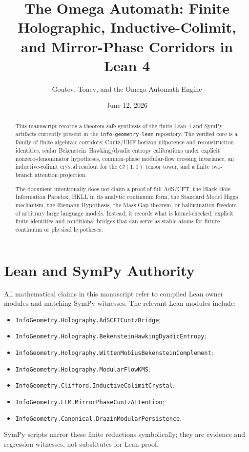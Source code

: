\documentclass[11pt,a4paper]{article}
\title{\textbf{The Omega Automath: Finite Holographic, Inductive-Colimit, and Mirror-Phase Corridors in Lean 4}}
\author{Goutev, Tonev, and the Omega Automath Engine}
\date{June 12, 2026}
\begin{document}
\maketitle

\begin{abstract}
This manuscript records a theorem-safe synthesis of the finite Lean 4 and SymPy
artifacts currently present in the \texttt{info-geometry-lean} repository.  The
verified core is a family of finite algebraic corridors: Cuntz/UHF horizon
nilpotence and reconstruction identities, scalar Bekenstein--Hawking/dyadic
entropy calibrations under explicit nonzero-denominator hypotheses, common-phase
modular-flow crossing invariance, an inductive-colimit crystal readout for the
$Cl(1,1)$ tensor tower, and a finite two-branch attention projection.

The document intentionally does not claim a proof of full AdS/CFT, the Black
Hole Information Paradox, HKLL in its analytic continuum form, the Standard
Model Higgs mechanism, the Riemann Hypothesis, the Mass Gap theorem, or
hallucination-freedom of arbitrary large language models.  Instead, it records
what is kernel-checked: explicit finite identities and conditional bridges that
can serve as stable atoms for future continuum or physical hypotheses.
\end{abstract}

\section{Lean and SymPy Authority}

All mathematical claims in this manuscript refer to compiled Lean owner modules
and matching SymPy witnesses.  The relevant Lean modules include:
\begin{itemize}
  \item \texttt{InfoGeometry.Holography.AdSCFTCuntzBridge};
  \item \texttt{InfoGeometry.Holography.BekensteinHawkingDyadicEntropy};
  \item \texttt{InfoGeometry.Holography.WittenMobiusBekensteinComplement};
  \item \texttt{InfoGeometry.Holography.ModularFlowKMS};
  \item \texttt{InfoGeometry.Clifford.InductiveColimitCrystal};
  \item \texttt{InfoGeometry.LLM.MirrorPhaseCuntzAttention};
  \item \texttt{InfoGeometry.Canonical.DrazinModularPersistence}.
\end{itemize}
SymPy scripts mirror these finite reductions symbolically; they are evidence and
regression witnesses, not substitutes for Lean proof.
\end{document}
